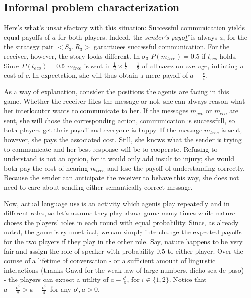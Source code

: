 \documentclass[10]{article}
\begin{document}
\subsection{Informal problem characterization}
Here's what's unsatisfactory with this situation: Successful communication yields equal payoffs of $a$ for both players. Indeed, the \textit{sender's payoff} is always $a$, for the the strategy pair $<S_3,R_3>$ garantuees successful communication. For the receiver, however, the story looks different. In $\sigma_3$ $P(m_{tree})=0.5$ if $t_{eco}$ holds. Since $P(t_{eco})=0.5$ $m_{tree}$ is sent in $\tfrac{1}{2}\times \tfrac{1}{2} = \tfrac{1}{2}$ of all cases on average, inflicting a cost of $c$. In expectation, she will thus obtain a mere payoff of $a-\tfrac{c}{4}$.

\begin{comment}
When played as an IBR, there are essentially two possible games: one where Player 1 is in the role of the sender and Player 2 in the role of receiver, and vice versa. Since the game is entirely symmetrical it will suffice to analyze just one such situation. The players' reasoning, and ultimately behavior, will be the same as their opponent's were they to find themselves in their position.
\end{comment}

As a way of explanation, consider the positions the agents are facing in this game. Whether the receiver likes the message or not, she can always reason what her interlocutor wants to communicate to her. If the messages $m_{geo}$ or $m_{eco}$ are sent, she will chose the corresponding action, communication is successfull, so both players get their payoff and everyone is happy. If the message $m_{tree}$ is sent, however, she pays the associated cost. Still, she knows what the sender is trying to communicate and her best response will be to cooperate. Refusing to understand is not an option, for it would only add insult to injury; she would both pay the cost of hearing $m_{tree}$ and lose the payoff of understanding correctly. Because the sender can anticipate the receiver to behave this way, she does not need to care about sending either semantically correct message.

Now, actual language use is an activity which agents play repeatedly and in different roles, so let's assume they play above game many times while nature choses the players' roles in each round with equal probability. Since, as already noted, the game is symmetrical, we can simply interchange the expected payoffs for the two players if they play in the other role. Say, nature happens to be very fair and assign the role of speaker with probability 0.5 to either player. Over the course of a lifetime of conversation - or a sufficient amount of linguistic interactions (thanks Gawd for the weak law of large numbers, dicho sea de paso) - the players can expect a utility of $a-\tfrac{o^i}{8}$, for $i\in \{1,2\}$. Notice that $a-\tfrac{o^i}{8} > a-\tfrac{o^i}{4}$, for any $o^i,a>0$. %
\end{document}
